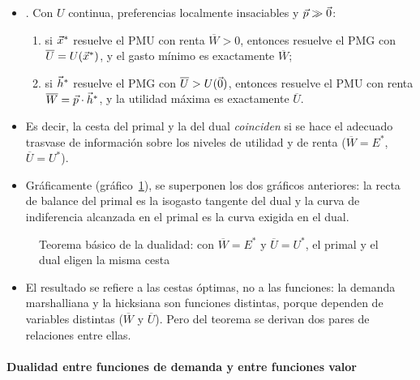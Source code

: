 \documentclass[11pt]{article}
\begin{document}
\begin{itemize}
\item {}\nocite{MasColellWhinstonGreen1995}. Con $U$ continua, preferencias localmente insaciables y $\vec{p}\gg\vec{0}$:
  \begin{enumerate}
  \item si $\vec{x}^*$ resuelve el PMU con renta $\overline{W}>0$, entonces resuelve el PMG con $\overline{U}=U(\vec{x}^*)$, y el gasto mínimo es exactamente $\overline{W}$;
  \item si $\vec{h}^*$ resuelve el PMG con $\overline{U}>U(\vec{0})$, entonces resuelve el PMU con renta $\overline{W}=\vec{p}\cdot\vec{h}^*$, y la utilidad máxima es exactamente $\overline{U}$.
  \end{enumerate}
\item Es decir, la cesta del primal y la del dual \emph{coinciden} si se hace el adecuado trasvase de información sobre los niveles de utilidad y de renta ($\overline{W}=E^*$, $\overline{U}=U^*$).
\item Gráficamente (gráfico~\ref{fig:primal-dual}), se superponen los dos gráficos anteriores: la recta de balance del primal es la isogasto tangente del dual y la curva de indiferencia alcanzada en el primal es la curva exigida en el dual.
\end{itemize}

\begin{figure}[H]
\centering
\caption{Teorema básico de la dualidad: con $\overline{W}=E^*$ y $\overline{U}=U^*$, el primal y el dual eligen la misma cesta}\label{fig:primal-dual}
\end{figure}

\begin{itemize}
\item El resultado se refiere a las cestas óptimas, no a las funciones: la demanda marshalliana y la hicksiana son funciones distintas, porque dependen de variables distintas ($\overline{W}$ y $\overline{U}$). Pero del teorema se derivan dos pares de relaciones entre ellas.
\end{itemize}

\paragraph{Dualidad entre funciones de demanda y entre funciones valor}
\end{document}
